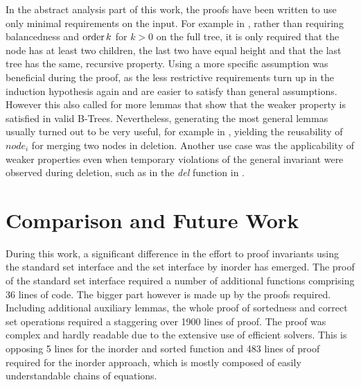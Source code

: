 
In the abstract analysis part of this work,
the proofs have been written to use only
minimal requirements on the input.
For example in , rather than
requiring balancedness and $\operatorname{order} k$ for $k > 0$ on the full tree,
it is only required that the node has at least two children,
the last two have equal height
and that the last tree has the same, recursive property.
Using a more specific assumption was beneficial during the proof,
as the less restrictive requirements turn up in the
induction hypothesis again and are easier to satisfy than general assumptions.
However this also called for more lemmas that show that
the weaker property is satisfied in valid B-Trees.
Nevertheless, generating the most general lemmas usually turned out to be
very useful, for example in , yielding the reusability of $node_i$ for
merging two nodes in deletion.
Another use case was the applicability of weaker properties
even when temporary violations
of the general invariant were observed during deletion,
such as in the \textit{del} function in .

\section{Comparison and Future Work}

During this work, a significant difference in the effort
to proof invariants using the standard set interface
and the set interface by inorder has emerged.
The proof of the standard set interface required a number of additional functions
comprising 36 lines of code.
The bigger part however is made up by the proofs required.
Including additional auxiliary lemmas, the whole proof of sortedness
and correct set operations required a staggering over 1900 lines of proof.
The proof was complex and hardly readable due to the 
extensive use of efficient solvers.
This is opposing 5 lines for the inorder and sorted function and
483 lines of proof required for the inorder approach,
which is mostly composed of easily understandable chains of equations.


